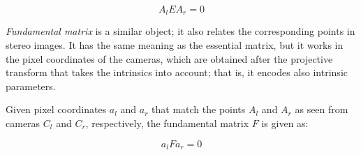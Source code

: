 \begin{equation} \label{eq:essential}
	A_l E A_r = 0
\end{equation}


%
%

\emph{Fundamental matrix} is a similar object; it also relates the corresponding points in stereo images.
It has the same meaning as the essential matrix, but it works in the pixel coordinates of the cameras, which are obtained after the projective transform that takes the intrinsics into account; that is, it encodes also intrinsic parameters.

Given pixel coordinates $a_l$ and $a_r$ that match the points $A_l$ and $A_r$ as seen from cameras $C_l$ and $C_r$, respectively, the fundamental matrix $F$ is given as:

\begin{equation} \label{eq:fundamental}
	a_l F a_r = 0
\end{equation}


%
%
%
%

